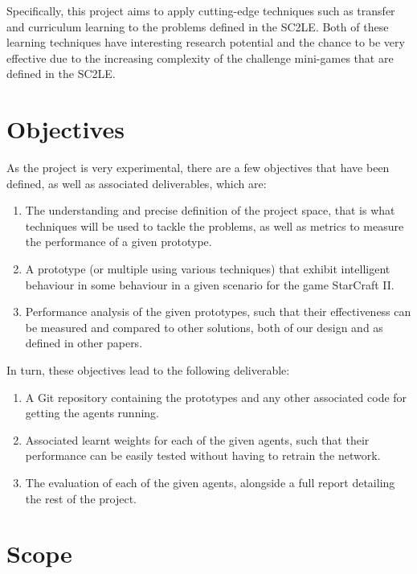 Specifically, this project aims to apply cutting-edge techniques such as
transfer and curriculum learning to the problems defined in the SC2LE\@.  Both
of these learning techniques have interesting research potential and the chance
to be very effective due to the increasing complexity of the challenge
mini-games that are defined in the SC2LE\@.

\section{Objectives}

As the project is very experimental, there are a few objectives that
have been defined, as well as associated deliverables, which are:

\begin{enumerate}
    \item The understanding and precise definition of the project space, that is
        what techniques will be used to tackle the problems, as well as metrics
        to measure the performance of a given prototype.
    \item A prototype (or multiple using various techniques) that exhibit
        intelligent behaviour in some behaviour in a given scenario for
        the game StarCraft II\@.
    \item Performance analysis of the given prototypes, such that their
        effectiveness can be measured and compared to other solutions, both of
        our design and as defined in other papers.
\end{enumerate}

In turn, these objectives lead to the following deliverable:

\begin{enumerate}
    \item A Git repository containing the prototypes and any other associated
        code for getting the agents running.
    \item Associated learnt weights for each of the given agents, such that
        their performance can be easily tested without having to retrain
        the network.
    \item The evaluation of each of the given agents, alongside a full report
        detailing the rest of the project.
\end{enumerate}

\section{Scope}

